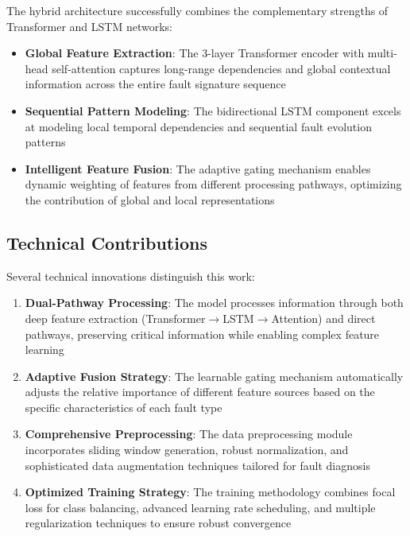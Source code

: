 The hybrid architecture successfully combines the complementary strengths of Transformer and LSTM networks:

\begin{itemize}
    \item \textbf{Global Feature Extraction}: The 3-layer Transformer encoder with multi-head self-attention captures long-range dependencies and global contextual information across the entire fault signature sequence
    \item \textbf{Sequential Pattern Modeling}: The bidirectional LSTM component excels at modeling local temporal dependencies and sequential fault evolution patterns
    \item \textbf{Intelligent Feature Fusion}: The adaptive gating mechanism enables dynamic weighting of features from different processing pathways, optimizing the contribution of global and local representations
\end{itemize}

\subsection{Technical Contributions}
\label{subsec:technical_contributions}

Several technical innovations distinguish this work:

\begin{enumerate}
    \item \textbf{Dual-Pathway Processing}: The model processes information through both deep feature extraction (Transformer$\rightarrow$LSTM$\rightarrow$Attention) and direct pathways, preserving critical information while enabling complex feature learning
    
    \item \textbf{Adaptive Fusion Strategy}: The learnable gating mechanism automatically adjusts the relative importance of different feature sources based on the specific characteristics of each fault type
    
    \item \textbf{Comprehensive Preprocessing}: The data preprocessing module incorporates sliding window generation, robust normalization, and sophisticated data augmentation techniques tailored for fault diagnosis
    
    \item \textbf{Optimized Training Strategy}: The training methodology combines focal loss for class balancing, advanced learning rate scheduling, and multiple regularization techniques to ensure robust convergence
\end{enumerate}

